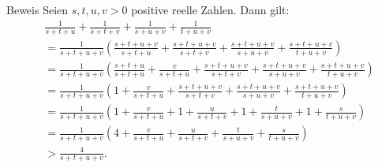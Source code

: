 \documentclass[10pt]{beamer}
\begin{document}
\begin{frame}{Beweis}
    Seien \( s, t, u, v > 0 \) positive reelle Zahlen. Dann gilt:
    \begin{align*}
        & \frac{1}{s + t + u} + \frac{1}{s + t + v} + \frac{1}{s + u + v} + \frac{1}{t + u + v} \\
        & = \frac{1}{s + t + u + v} \left( \frac{s + t + u + v}{s + t + u} + \frac{s + t + u + v}{s + t + v} + \frac{s + t + u + v}{s + u + v} + \frac{s + t + u + v}{t + u + v} \right) \\
        & = \frac{1}{s + t + u + v} \left( \frac{s + t + u}{s + t + u} + \frac{v}{s + t + u} + \frac{s + t + u + v}{s + t + v} + \frac{s + t + u + v}{s + u + v} + \frac{s + t + u + v}{t + u + v} \right) \\
        & = \frac{1}{s + t + u + v} \left( 1 + \frac{v}{s + t + u} + \frac{s + t + u + v}{s + t + v} + \frac{s + t + u + v}{s + u + v} + \frac{s + t + u + v}{t + u + v} \right) \\
        & = \frac{1}{s + t + u + v} \left( 1 + \frac{v}{s + t + u} + 1 + \frac{u}{s + t + v} + 1 + \frac{t}{s + u + v} + 1 + \frac{s}{t + u + v} \right) \\
        & = \frac{1}{s + t + u + v} \left( 4 + \frac{v}{s + t + u} + \frac{u}{s + t + v} + \frac{t}{s + u + v} + \frac{s}{t + u + v} \right) \\
        & > \frac{4}{s + t + u + v}.
    \end{align*}
\end{frame}
\end{document}

